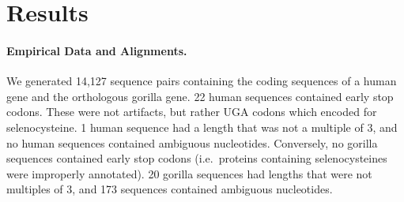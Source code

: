 \documentclass[12pt,letterpaper]{article}
\begin{document}



\section*{Results}

\paragraph{Empirical Data and Alignments.}

We generated 14,127 sequence pairs containing the coding sequences of a human gene and the orthologous gorilla gene. 22 human sequences contained early stop codons. These were not artifacts, but rather UGA codons which encoded for selenocysteine. 1 human sequence had a length that was not a multiple of 3, and no human sequences contained ambiguous nucleotides. Conversely, no gorilla sequences contained early stop codons (i.e.\ proteins containing selenocysteines were improperly annotated). 20 gorilla sequences had lengths that were not multiples of 3, and 173 sequences contained ambiguous nucleotides.
\end{document}
